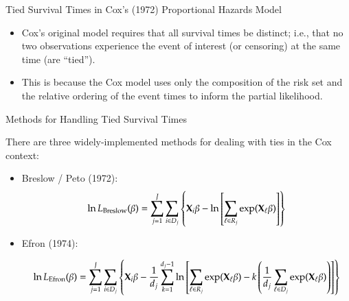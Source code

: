 \documentclass[structurebold,final,hyperref=pdftex,bookmarks,colorlinks,breaklinks]{beamer}
\begin{document}
\begin{frame}
\begin{columns}[t]
\begin{column}{0.24\linewidth}
\begin{block}{Tied Survival Times in Cox's (1972) Proportional Hazards Model}
\begin{itemize}
        where $J$ is the set of all survival times, $D_{j}$ is the set of $d_{j}$ observations failing at time $t_{j}$, and $R_{j}$ denotes the set of observations ``at risk'' for failure at $t_{j}$.\\

        \vspace{2 mm}

        \item Cox's original model requires that all survival times be distinct; i.e., that no two observations experience the event of interest (or censoring) at the same time (are ``tied'').

        \vspace{2 mm}

        \item This is because the Cox model uses only the composition of the risk set and the relative ordering of the event times to inform the partial likelihood.

        \end{itemize}

      \end{block}

      \begin{block}{Methods for Handling Tied Survival Times}

      There are three widely-implemented methods for dealing with ties in the Cox context:

      \begin{itemize}
      \item Breslow / Peto (1972):
      \begin{equation*}
      \ln L_{\text{Breslow}}(\beta) = \sum_{j=1}^{J} \sum_{i \in D_{j}} \left\{ {\bf X}_{i} \beta - \ln \left[ \sum_{\ell \in R_{j}} \exp ({\bf X}_{\ell} \beta)  \right]  \right\}
      \end{equation*}

      \vspace{2 mm}

      \item Efron (1974):
      \begin{small}
      \begin{equation*}
      \ln L_{\text{Efron}}(\beta) = \sum_{j=1}^{J} \sum_{i \in D_{j}} \left\{ {\bf X}_{i} \beta - \frac{1}{d_{j}} \sum_{k=1}^{d_{j}-1} \ln \left[ \sum_{\ell \in R_{j}} \exp ({\bf X}_{\ell} \beta)  - k \left( \frac{1}{d_{j}} \sum_{\ell \in D_{j}} \exp({\bf X}_{\ell} \beta) \right) \right]  \right\}
      \end{equation*}
      \end{small}


\end{itemize}
\end{block}
\end{column}
\end{columns}
\end{frame}
\end{document}
